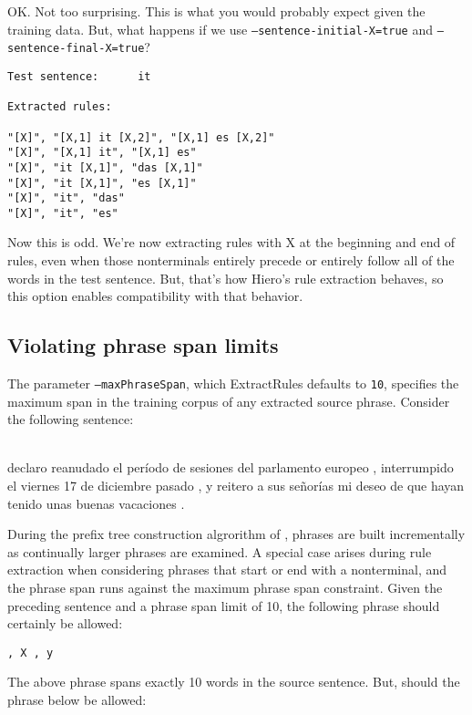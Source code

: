 OK. Not too surprising. This is what you would probably expect given the training data. But, what happens if we use {\tt --sentence-initial-X=true} and {\tt --sentence-final-X=true}?

\begin{verbatim}
Test sentence:		it

Extracted rules:

"[X]", "[X,1] it [X,2]", "[X,1] es [X,2]"
"[X]", "[X,1] it", "[X,1] es"
"[X]", "it [X,1]", "das [X,1]"
"[X]", "it [X,1]", "es [X,1]"
"[X]", "it", "das"
"[X]", "it", "es"
\end{verbatim}

Now this is odd. We're now extracting rules with X at the beginning and end of rules, even when those nonterminals entirely precede or entirely follow all of the words in the test sentence. But, that's how Hiero's rule extraction behaves, so this option enables compatibility with that behavior.


\subsection{Violating phrase span limits}

The parameter {\tt --maxPhraseSpan}, which ExtractRules defaults to {\tt 10}, specifies the maximum span in the training corpus of any extracted source phrase. Consider the following sentence:

\begin{tt}
\ \\
declaro reanudado el per\'iodo de sesiones del parlamento europeo , interrumpido el viernes 17 de diciembre pasado , y reitero a sus se\~nor\'ias mi deseo de que hayan tenido unas buenas vacaciones .
\ \\
\end{tt}

During the prefix tree construction algrorithm of , phrases are built incrementally as continually larger phrases are examined.  A special case arises during rule extraction when considering phrases that start or end with a nonterminal, and the phrase span runs against the maximum phrase span constraint.  Given the preceding sentence and a phrase span limit of 10, the following phrase should certainly be allowed:

\begin{verbatim}
, X , y
\end{verbatim}

The above phrase spans exactly 10 words in the source sentence. But, should the phrase below be allowed:

